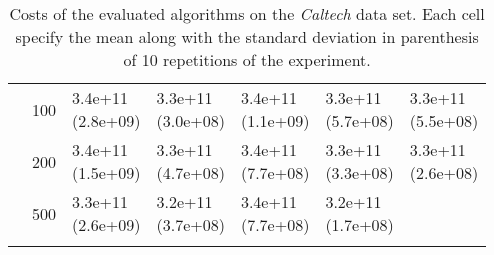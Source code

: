 \begin{longtable}{lllllll}
   & 100 &  \parbox[t]{17mm}{3.4e+11\\\small(2.8e+09)} &  \parbox[t]{17mm}{3.3e+11\\\small(3.0e+08)} &  \parbox[t]{17mm}{3.4e+11\\\small(1.1e+09)} &  \parbox[t]{17mm}{3.3e+11\\\small(5.7e+08)} &  \parbox[t]{17mm}{3.3e+11\\\small(5.5e+08)} \\
   & 200 &  \parbox[t]{17mm}{3.4e+11\\\small(1.5e+09)} &  \parbox[t]{17mm}{3.3e+11\\\small(4.7e+08)} &  \parbox[t]{17mm}{3.4e+11\\\small(7.7e+08)} &  \parbox[t]{17mm}{3.3e+11\\\small(3.3e+08)} &  \parbox[t]{17mm}{3.3e+11\\\small(2.6e+08)} \\
   & 500 &  \parbox[t]{17mm}{3.3e+11\\\small(2.6e+09)} &  \parbox[t]{17mm}{3.2e+11\\\small(3.7e+08)} &  \parbox[t]{17mm}{3.4e+11\\\small(7.7e+08)} &  \parbox[t]{17mm}{3.2e+11\\\small(1.7e+08)} &                 \\
\bottomrule
\caption{Costs of the evaluated algorithms on the \textit{Caltech} data set. Each cell specify the mean along with the standard deviation in parenthesis of 10 repetitions of the experiment.}
\label{tab:real-cost-mean-std-caltech}
\end{longtable}

